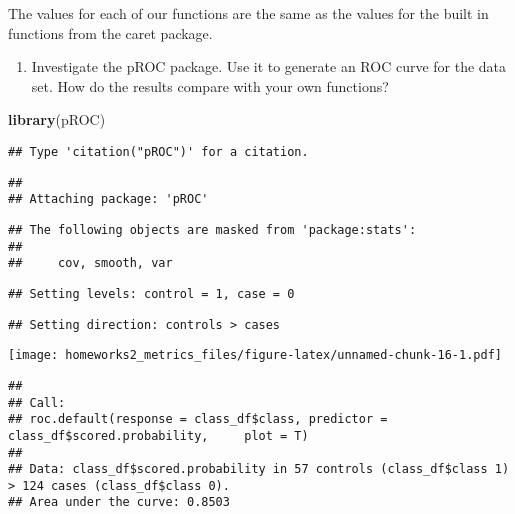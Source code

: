 \documentclass[
]{article}
\newenvironment{Shaded}{\begin{snugshade}}{\end{snugshade}}
\newcommand{\AttributeTok}[1]{\textcolor[rgb]{0.13,0.29,0.53}{#1}}
\newcommand{\FunctionTok}[1]{\textcolor[rgb]{0.13,0.29,0.53}{\textbf{#1}}}
\newcommand{\NormalTok}[1]{#1}
\newcommand{\SpecialCharTok}[1]{\textcolor[rgb]{0.81,0.36,0.00}{\textbf{#1}}}
\providecommand{\tightlist}{%
  \setlength{\itemsep}{0pt}\setlength{\parskip}{0pt}}
\begin{document}
The values for each of our functions are the same as the values for the
built in functions from the caret package.

\begin{enumerate}
\def\labelenumi{\arabic{enumi}.}
\setcounter{enumi}{12}
\tightlist
\item
  Investigate the pROC package. Use it to generate an ROC curve for the
  data set. How do the results compare with your own functions?
\end{enumerate}

\begin{Shaded}
\begin{Highlighting}[]
\FunctionTok{library}\NormalTok{(pROC)}
\end{Highlighting}
\end{Shaded}

\begin{verbatim}
## Type 'citation("pROC")' for a citation.
\end{verbatim}

\begin{verbatim}
## 
## Attaching package: 'pROC'
\end{verbatim}

\begin{verbatim}
## The following objects are masked from 'package:stats':
## 
##     cov, smooth, var
\end{verbatim}

\begin{Shaded}
\end{Shaded}

\begin{verbatim}
## Setting levels: control = 1, case = 0
\end{verbatim}

\begin{verbatim}
## Setting direction: controls > cases
\end{verbatim}

\texttt{[image: homeworks2\_metrics\_files/figure-latex/unnamed-chunk-16-1.pdf]}

\begin{verbatim}
## 
## Call:
## roc.default(response = class_df$class, predictor = class_df$scored.probability,     plot = T)
## 
## Data: class_df$scored.probability in 57 controls (class_df$class 1) > 124 cases (class_df$class 0).
## Area under the curve: 0.8503
\end{verbatim}
\end{document}
